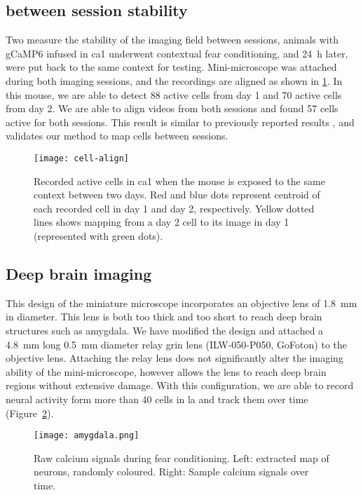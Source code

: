 \subsection{between session stability}
Two measure the stability of the imaging field between sessions, animals with gCaMP6 infused in \gls{ca1} underwent contextual fear conditioning, and \SI{24}{\hour} later, were put back to the same context for testing. Mini-microscope was attached during both imaging sessions, and the recordings are aligned as shown in \ref{f.cellalign}. In this mouse, we are able to detect 88 active cells from day 1 and 70 active cells from day 2. We are able to align videos from both sessions and found 57 cells active for both sessions. This result is similar to previously reported results \citep{ziv13}, and validates our method to map cells between sessions.

\begin{figure}[h]
    \centering
    \texttt{[image: cell-align]}
    \caption{Recorded active cells in \gls{ca1} when the mouse is exposed to the same context between two days. Red and blue dots represent centroid of each recorded cell in day 1 and day 2, respectively. Yellow dotted lines shows mapping from a day 2 cell to its image in day 1 (represented with green dots). \label{f.cellalign}}
\end{figure}


\subsection{Deep brain imaging}
This design of the miniature microscope incorporates an objective lens of \SI{1.8}{\mm} in diameter. This lens is both too thick and too short to reach deep brain structures such as amygdala. We have modified the design and attached a \SI{4.8}{\mm} long \SI{0.5}{\mm} diameter relay \gls{grin} lens (ILW-050-P050, GoFoton) to the objective lens. Attaching the relay lens does not significantly alter the imaging ability of the mini-microscope, however allows the lens to reach deep brain regions without extensive damage. With this configuration, we are able to record neural activity form more than 40 cells in \gls{la} and track them over time (Figure~\ref{f.amygdala}).
\begin{figure}[h]
    \centering
    \texttt{[image: amygdala.png]}
    \caption{Raw calcium signals during fear conditioning. Left: extracted map of neurons, randomly coloured. Right: Sample calcium signals over time.\label{f.amygdala}}

\end{figure}

